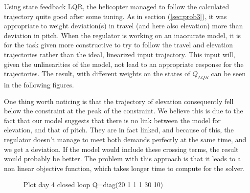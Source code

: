 Using state feedback LQR, the helicopter managed to follow the calculated trajectory quite good after some tuning. As in section (\ref{sec:prob3}), it was appropriate to weight deviation(s) in travel (and here also elevation) more than deviation in pitch. When the regulator is working on an inaccurate model, it is for the task given more constructive to try to follow the travel and elevation trajectories rather than the ideal, linearized input trajectory. This input will, given the unlinearities of the model, not lead to an appropriate response for the trajectories. The result, with different weights on the states of $Q_{LQR}$ can be seen in the following figures. %

One thing worth noticing is that the trajectory of elevation consequently fell below the constraint at the peak of the constraint. We believe this is due to the fact that our model suggests that there is no link between the model for elevation, and that of pitch. They are in fact linked, and because of this, the regulator doesn't manage to meet both demands perfectly at the same time, and we get a deviation. If the model would include these crossing terms, the result would probably be better. The problem with this approach is that it leads to a non linear objective function, which takes longer time to compute for the solver.
\begin{figure}[htb]
	\centering
	\caption{Plot day 4 closed loop Q=diag(20 1 1 1 30 10)}
	\label{fig:day4_cl_plot_20_1_1_1_30_10}
\end{figure}

